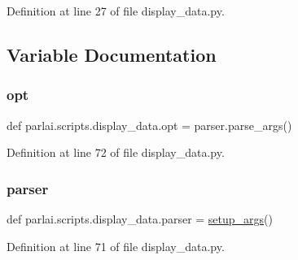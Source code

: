 Definition at line 27 of file display\+\_\+data.\+py.



\subsection{Variable Documentation}
\mbox{\label{namespaceparlai_1_1scripts_1_1display__data_ae32a1a88bf398939e558e8eb7d1cb94e}} 
\subsubsection{\texorpdfstring{opt}{opt}}
{\footnotesize\ttfamily def parlai.\+scripts.\+display\+\_\+data.\+opt = parser.\+parse\+\_\+args()}



Definition at line 72 of file display\+\_\+data.\+py.

\mbox{\label{namespaceparlai_1_1scripts_1_1display__data_a5fa87e5f2fd5df26d1eac44bd92cf31e}} 
\subsubsection{\texorpdfstring{parser}{parser}}
{\footnotesize\ttfamily def parlai.\+scripts.\+display\+\_\+data.\+parser = \hyperlink{namespaceparlai_1_1scripts_1_1display__data_a666e6177939b9a63961e56a1dfdc74b4}{setup\+\_\+args}()}



Definition at line 71 of file display\+\_\+data.\+py.

